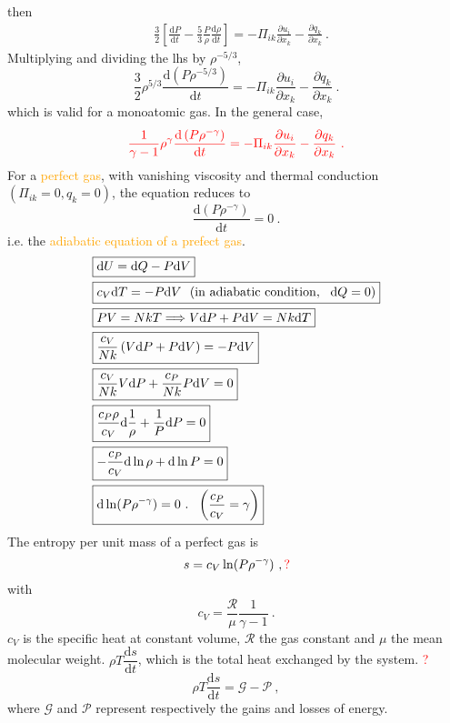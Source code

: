 \documentclass[12pt,a4paper]{article}
\newcommand{\dif}{\mathrm{d}}
\begin{document}
then
\begin{align*}
& \frac{3}{2} \left[\frac{\dif P}{\dif t} -\frac{5}{3} \frac{P}{\rho} \frac{\dif \rho}{\dif t} \right] = -\Pi_{ik} \frac{\partial u_i}{\partial x_k} -\frac{\partial q_k}{\partial x_k} ~.
\end{align*}
Multiplying and dividing the lhs by $\rho^{-5/3}$, 
\begin{equation}
\frac{3}{2} \rho^{5/3} \frac{\dif \left(P \rho^{-5/3}\right)}{\dif t} = -\Pi_{ik} \frac{\partial u_i}{\partial x_k} -\frac{\partial q_k}{\partial x_k} ~.
\end{equation}
which is valid for a monoatomic gas. In the general case, 
\begin{equation}
\color{red} \frac{1}{\gamma-1} \rho^\gamma \frac{\dif \left(P \rho^{-\gamma} \right)}{\dif t} = -\Pi_{ik} \frac{\partial u_i}{\partial x_k} -\frac{\partial q_k}{\partial x_k} ~.
\label{gen_adia}
\end{equation}
For a \textcolor{orange}{perfect gas}, with vanishing viscosity and thermal conduction $(\Pi_{ik} = 0, q_k = 0)$, the equation reduces to
\begin{equation*}
\frac{\dif \left(P \rho^{-\gamma} \right)}{\dif t} = 0 ~.
\end{equation*}
i.e. the \textcolor{orange}{adiabatic equation of a prefect gas}.
\begin{align*}
& \boxed{\dif U = \dif Q -P \dif V } \\
& \boxed{c_V \dif T = -P \dif V ~~({\rm in ~adiabatic ~condition}, ~~\dif Q = 0) }\\
& \boxed{PV = Nk T \Longrightarrow V \dif P +P \dif V = Nk \dif T} \\
& \boxed{\frac{c_V}{Nk} \left(V \dif P +P \dif V \right) = -P \dif V } \\
& \boxed{\frac{c_V}{Nk} V \dif P +\frac{c_P}{Nk} P \dif V = 0 } \\
& \boxed{\frac{c_P \rho}{c_V} \dif \frac{1}{\rho} +\frac{1}{P} \dif P = 0 } \\
& \boxed{-\frac{c_P}{c_V} \dif \ln \rho +\dif \ln P = 0 } \\
& \boxed{\dif \ln(P \rho^{-\gamma}) = 0~. ~~\left( \frac{c_P}{c_V} = \gamma \right) }
\end{align*}
The entropy per unit mass of a perfect gas is 
\begin{equation*}
s = c_V \ln(P \rho^{-\gamma}) ~, \color{red}{?}
\end{equation*}
with
\begin{equation*}
c_V = \frac{\mathcal{R}}{\mu} \frac{1}{\gamma-1} ~.
\end{equation*}
$c_V$ is the specific heat at constant volume, $\mathcal{R}$ the gas constant and $\mu$ the mean molecular weight.  $\rho T\dfrac{\dif s}{\dif t}$, which is the total heat exchanged by the system. \textcolor{red}{?}
\begin{equation}
\rho T \frac{\dif s}{\dif t} = \mathcal{G} -\mathcal{P} ~,
\end{equation}
where $\mathcal{G}$ and $\mathcal{P}$ represent respectively the gains and losses of energy.
\end{document}
